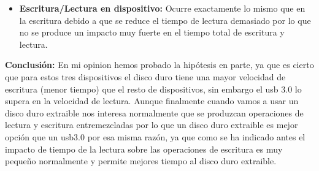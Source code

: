 \documentclass[a4paper, 10pt]{article} %
\begin{document}
\begin{itemize}
\begin{verbatim}
\end{verbatim}
Intervalos de confianza(respectivamente): 
\begin{verbatim}
[87,1445900944, 90,5017299056]
[205,0810190598, 218,6837809402]
[274,9104340972, 365,0881899028]


\end{verbatim}
Velocidades:
\begin{verbatim}
USB3.0	DISCOEXTRAIBLE	USB2.0
	
56,6041	23,2206	14,0712
54,8392	23,0947	13,9605
56,378	24,2866	18,1342
56,7686	23,171	16,03675
56,9194	24,2808	17,2674
\end{verbatim}
Intervalos de confianza(respectivamente): 
\begin{verbatim}
[55,2564035274, 57,3473164726]
[22,8459201016, 24,3755598984]
[13,5722208951, 18,2157991049]
\end{verbatim}
\begin{figure}[H]
\centering 
\texttt{[image: bm7.png]} 
\caption{Gráfica de Tiempo de lectura.} 
\label{contexto:figura} 
\end{figure}
\begin{figure}[H]
\centering 
\texttt{[image: bm8.png]} 
\caption{Gráfica de Velocidad de lectura.} 
\label{contexto:figura} 
\end{figure}
\item \textbf{Escritura/Lectura en dispositivo:} Ocurre exactamente lo mismo que en la escritura debido a que se reduce el tiempo de lectura demasiado por lo que no se produce un impacto muy fuerte en el tiempo total de escritura y lectura. 
\end{itemize}
\textbf{Conclusión:} En mi opinion hemos probado la hipótesis en parte, ya que es cierto que para estos tres dispositivos el disco duro tiene una mayor velocidad de escritura (menor tiempo) que el resto de dispositivos, sin embargo el usb 3.0 lo supera en la velocidad de lectura. Aunque finalmente cuando vamos a usar un disco duro extraible nos interesa normalmente que se produzcan operaciones de lectura y escritura entremezcladas por lo que un disco duro extraible es mejor opción que un usb3.0 por esa misma razón, ya que como se ha indicado antes el impacto de tiempo de la lectura sobre las operaciones de escritura es muy pequeño normalmente y permite mejores tiempo al disco duro extraible.

\pagebreak
\end{document}
